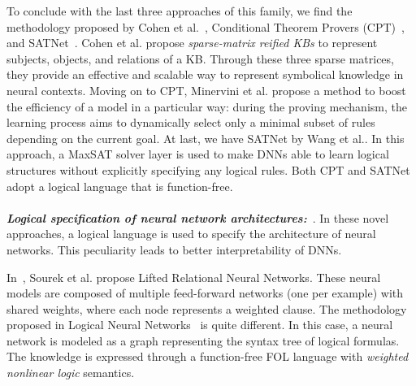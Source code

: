 To conclude with the last three approaches of this family, we find the methodology proposed by Cohen et al.~\cite{cohen2020scalable}, Conditional Theorem Provers (CPT)~\cite{conditionalTheoremProvers}, and SATNet~\cite{satnet}. Cohen et al. propose \textit{sparse-matrix reified KBs} to represent subjects, objects, and relations of a KB. Through these three sparse matrices, they provide an effective and scalable way to represent symbolical knowledge in neural contexts. Moving on to CPT, Minervini et al. propose a method to boost the efficiency of a model in a particular way: during the proving mechanism, the learning process aims to dynamically select only a minimal subset of rules depending on the current goal. At last, we have SATNet by Wang et al.. In this approach, a MaxSAT solver layer is used to make DNNs able to learn logical structures without explicitly specifying any logical rules. Both CPT and SATNet adopt a logical language that is function-free.
\\\\
\textit{\textbf{Logical specification of neural network architectures:}}~\cite{liftedRelationaNeuralNetworks,logicalNeuralNetworks}. In these novel approaches, a logical language is used to specify the architecture of neural networks. This peculiarity leads to better interpretability of DNNs.

In~\cite{liftedRelationaNeuralNetworks}, Sourek et al. propose Lifted Relational Neural Networks. These neural models are composed of multiple feed-forward networks (one per example) with shared weights, where each node represents a weighted clause. The methodology proposed in Logical Neural Networks~\cite{logicalNeuralNetworks} is quite different. In this case, a neural network is modeled as a graph representing the syntax tree of logical formulas. The knowledge is expressed through a function-free FOL language with \textit{weighted nonlinear logic} semantics.

